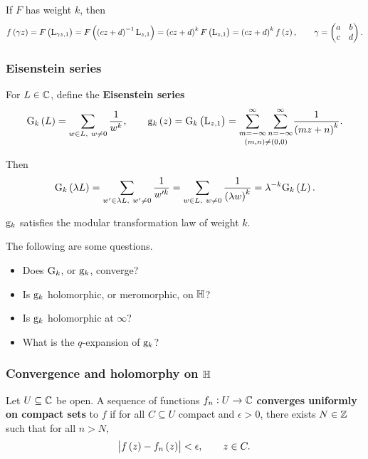 If $ F $ has weight $ k $, then
$$ f\br{\gamma z} = F\br{\L_{\gamma z, 1}} = F\br{\br{cz + d}^{-1}\L_{z, 1}} = \br{cz + d}^kF\br{\L_{z, 1}} = \br{cz + d}^kf\br{z}, \qquad \gamma = \twobytwo{a}{b}{c}{d}. $$

\pagebreak

\subsubsection{Eisenstein series}


\begin{definition}
For $ L \in \mathbb{C} $, define the \textbf{Eisenstein series}
$$ \G_k\br{L} = \sum_{w \in L, \ w \ne 0} \dfrac{1}{w^k}, \qquad \g_k\br{z} = \G_k\br{\L_{z, 1}} = \underset{\br{m, n} \ne \br{0, 0}}{\sum_{m = -\infty}^\infty \sum_{n = -\infty}^\infty} \dfrac{1}{\br{mz + n}^k}. $$
\end{definition}

Then
$$ \G_k\br{\lambda L} = \sum_{w' \in \lambda L, \ w' \ne 0} \dfrac{1}{w'^k} = \sum_{w \in L, \ w \ne 0} \dfrac{1}{\br{\lambda w}^k} = \lambda^{-k}\G_k\br{L}. $$

\begin{corollary}
$ \mathrm{g}_k $ satisfies the modular transformation law of weight $ k $.
\end{corollary}

The following are some questions.
\begin{itemize}
\item Does $ \mathrm{G}_k $, or $ \mathrm{g}_k $, converge?
\item Is $ \mathrm{g}_k $ holomorphic, or meromorphic, on $ \mathbb{H} $?
\item Is $ \mathrm{g}_k $ holomorphic at $ \infty $?
\item What is the $ q $-expansion of $ \mathrm{g}_k $?
\end{itemize}

\subsubsection{Convergence and holomorphy on \texorpdfstring{$ \mathbb{H} $}{H}}

\begin{definition}
Let $ U \subseteq \mathbb{C} $ be open. A sequence of functions $ f_n : U \to \mathbb{C} $ \textbf{converges uniformly on compact sets} to $ f $ if for all $ C \subseteq U $ compact and $ \epsilon > 0 $, there exists $ N \in \mathbb{Z} $ such that for all $ n > N $,
$$ \abs{f\br{z} - f_n\br{z}} < \epsilon, \qquad z \in C. $$
\end{definition}

